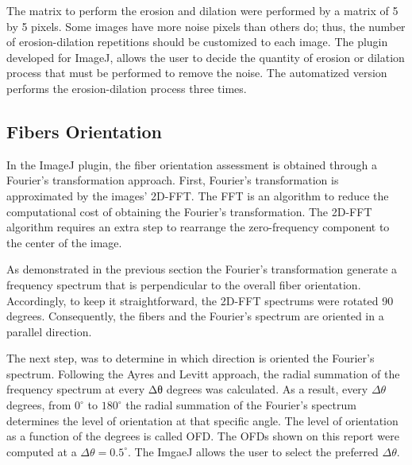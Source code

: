 \documentclass[12pt,a4paper]{article}
\begin{document}
The matrix to perform the erosion and dilation were performed by a matrix of 5 by 5 pixels. Some images have more noise pixels than others do; thus, the number of erosion-dilation repetitions should be customized to each image. The plugin developed for ImageJ, allows the user to decide the quantity of erosion or dilation process that must be performed to remove the noise. The automatized version performs the erosion-dilation process three times.
\subsection{Fibers Orientation}

In the ImageJ plugin, the fiber orientation assessment is obtained through a Fourier’s transformation approach. First, Fourier's transformation is approximated by the images' 2D-FFT. The FFT is an algorithm to reduce the computational cost of obtaining the Fourier’s transformation. The 2D-FFT algorithm requires an extra step to rearrange the zero-frequency component to the center of the image.

As demonstrated in the previous section the Fourier's transformation generate a frequency spectrum that is perpendicular to the overall fiber orientation. Accordingly, to keep it straightforward, the 2D-FFT spectrums were rotated 90 degrees. Consequently, the fibers and the Fourier’s spectrum are oriented in a parallel direction.

The next step, was to determine in which direction is oriented the Fourier’s spectrum. Following the Ayres and Levitt approach, the radial summation of the frequency spectrum at every Δθ degrees was calculated. As a result, every $\Delta\theta$ degrees, from $0^{\circ}$ to $180^{\circ}$ the radial summation of the Fourier’s spectrum determines the level of orientation at that specific angle. The level of orientation as a function of the degrees is called OFD.  The OFDs shown on this report were computed at a $\Delta\theta = 0.5^{\circ}$. The ImgaeJ allows the user to select the preferred $\Delta\theta$.
\end{document}
